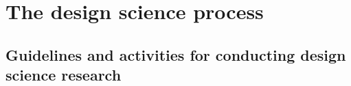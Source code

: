 

\section{The design science process}
\subsection{Guidelines and activities for conducting design science research}

